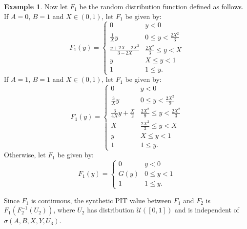 \documentclass[aap]{imsart}
\theoremstyle{plain}
\theoremstyle{definition}
\newtheorem{example}[theorem]{Example}
\begin{document}
\begin{example}
Now let $F_1$ be the random distribution function defined as follows. If $A = 0$, $B = 1$ and $X \in (0,1)$, let $F_1$ be given by:
\begin{equation*}
  F_1(y) = \begin{cases}
    0                      & y < 0 \\
    \frac{1}{X}y           & 0 \leq y < \frac{2 X^2}{3} \\
    \frac{y+2X-2X^2}{3-2X} & \frac{2 X^2}{3} \leq y < X \\
    y                      & X \leq y < 1 \\
    1                      & 1 \leq y.
  \end{cases}
\end{equation*}
If $A = 1$, $B = 1$ and $X \in (0,1)$, let $F_1$ be given by:
\begin{equation*}
  F_1(y) = \begin{cases}
    0                           & y < 0 \\
    \frac{3}{X}y                & 0 \leq y < \frac{2X^2}{9} \\
    \frac{3}{4X}y + \frac{X}{2} & \frac{2X^2}{9} \leq y < \frac{2X^2}{3} \\
    X                           & \frac{2X^2}{3} \leq y < X \\
    y                           & X \leq y < 1 \\
    1                           & 1 \leq y.
  \end{cases}
\end{equation*}
Otherwise, let $F_1$ be given by:
\begin{equation*}
  F_1(y) = \begin{cases}
    0    & y < 0 \\
    G(y) & 0 \leq y < 1 \\
    1    & 1 \leq y.
  \end{cases}
\end{equation*}

Since $F_1$ is continuous, the synthetic PIT value between $F_1$ and $F_2$ is $F_1(F_2^{-1}(U_2))$, where $U_2$ has distribution $\mathcal{U}([0,1])$ and is independent of $\sigma(A, B, X, Y, U_3)$.


\end{example}
\end{document}
